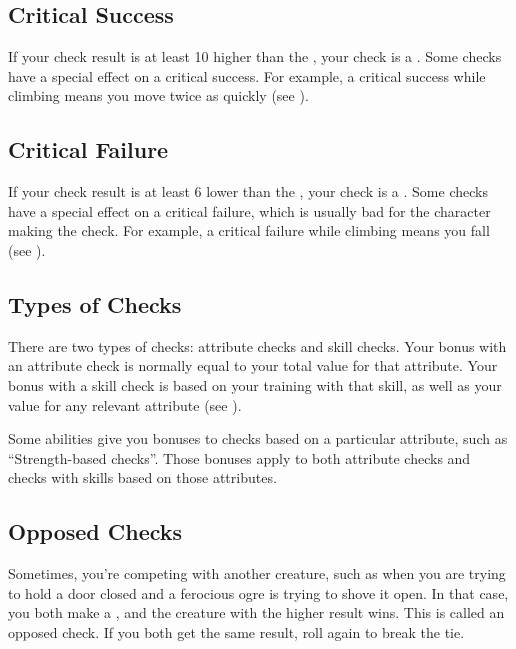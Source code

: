     \subsection{Critical Success}
        If your check result is at least 10 higher than the , your check is a .
        Some checks have a special effect on a critical success.
        For example, a critical success while climbing means you move twice as quickly (see ).

    \subsection{Critical Failure}
        If your check result is at least 6 lower than the , your check is a .
        Some checks have a special effect on a critical failure, which is usually bad for the character making the check.
        For example, a critical failure while climbing means you fall (see ).

    \subsection{Types of Checks}
        There are two types of checks: attribute checks and skill checks.
        Your bonus with an attribute check is normally equal to your total value for that attribute.
        Your bonus with a skill check is based on your training with that skill, as well as your value for any relevant attribute (see ).

        Some abilities give you bonuses to checks based on a particular attribute, such as ``Strength-based checks''.
        Those bonuses apply to both attribute checks and checks with skills based on those attributes.

    \subsection{Opposed Checks}
        Sometimes, you're competing with another creature, such as when you are trying to hold a door closed and a ferocious ogre is trying to shove it open.
        In that case, you both make a , and the creature with the higher result wins.
        This is called an opposed check.
        If you both get the same result, roll again to break the tie.

